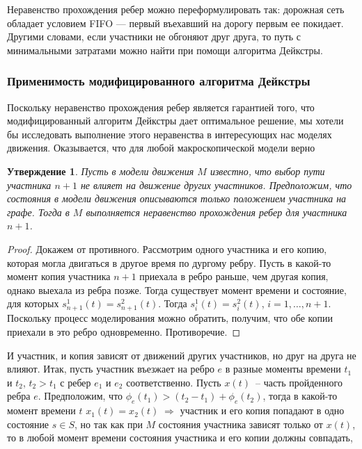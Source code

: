 \documentclass[12pt, a4paper]{article}
\newtheorem{state}{Утверждение}[section]
\begin{document}
	Неравенство прохождения ребер можно переформулировать так: дорожная сеть обладает условием FIFO --- первый въехавший на дорогу первым ее покидает. Другими словами, если участники не обгоняют друг друга, то путь с минимальными затратами можно найти при помощи алгоритма Дейкстры.
	
	\subsubsection{Применимость модифицированного алгоритма Дейкстры}
	
	Поскольку неравенство прохождения ребер является гарантией того, что модифицированный алгоритм Дейкстры дает оптимальное решение, мы хотели бы исследовать выполнение этого неравенства в интересующих нас моделях движения. Оказывается, что для любой макроскопической модели верно 
	
	\begin{state}
		Пусть в модели движения $M$ известно, что выбор пути участника $n+1$ не влияет на движение других участников. Предположим, что состояния в модели движения описываются только положением участника на графе. Тогда в $M$ выполняется неравенство прохождения ребер для участника $n+1$.
	\end{state}
	
	\begin{proof}
		Докажем от противного. Рассмотрим одного участника и его копию, которая могла двигаться в другое время по дургому ребру. Пусть в какой-то момент копия участника $n+1$ приехала в ребро раньше, чем другая копия, однако выехала из ребра позже. Тогда существует момент времени и состояние, для которых $s_{n+1}^1(t)  = s_{n+1}^2(t)$. Тогда $s_i^1(t) = s_i^2(t)$, $i = 1, \ldots, n + 1$. Поскольку процесс моделирования можно обратить, получим, что обе копии приехали в это ребро одновременно. Противоречие.
	\end{proof}
	
	
	И участник, и копия зависят от движений других участников, но друг на друга не влияют. Итак, пусть участник въезжает на ребро $e$ в разные моменты времени $t_1$ и $t_2$, $t_2 > t_1$ с ребер $e_1$ и $e_2$ соответственно. Пусть $x(t)$~-- часть пройденного ребра $e$. Предположим, что $\phi_e(t_1) > (t_2-t_1) + \phi_e(t_2)$, тогда в какой-то момент времени $t$ $x_1(t) = x_2(t) \; \Rightarrow  $ участник и его копия попадают в одно состояние $s \in S$, но так как при $M$ состояния участника зависят только от $x(t)$, то в любой момент времени состояния участника и его копии должны совпадать,
	
\end{document}

